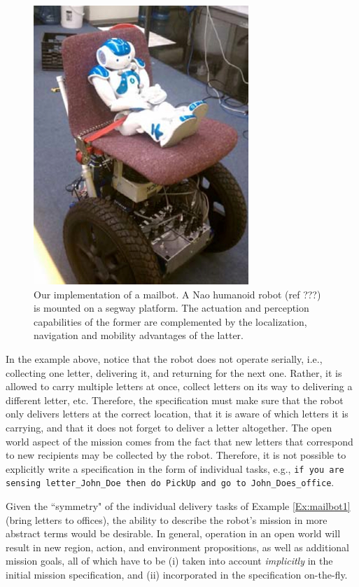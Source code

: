 \begin{figure}[ht]
	\centering
	\includegraphics[width=0.7\columnwidth, clip]{./img/pr3.jpg}
	\caption{Our implementation of a mailbot. A Nao humanoid robot (ref ???) is mounted on a segway platform. The actuation and perception capabilities of the former are complemented by the localization, navigation and mobility advantages of the latter.}
	\label{Fig:pr3}
\end{figure}

In the example above, notice that the robot does not operate serially, i.e., collecting one letter, delivering it, and returning for the next one. Rather, it is allowed to carry multiple letters at once, collect letters on its way to delivering a different letter, etc. Therefore, the specification must make sure that the robot only delivers letters at the correct location, that it is aware of which letters it is carrying, and that it does not forget to deliver a letter altogether. The open world aspect of the mission comes from the fact that new letters that correspond to new recipients may be collected by the robot. Therefore, it is not possible to explicitly write a specification in the form of individual tasks, e.g., \texttt{if you are sensing letter\_John\_Doe then do PickUp and go to John\_Does\_office}.

Given the ``symmetry" of the individual delivery tasks of Example \ref{Ex:mailbot1} (bring letters to offices), the ability to describe the robot's mission in more abstract terms would be desirable. In general, operation in an open world will result in new region, action, and environment propositions, as well as additional mission goals, all of which have to be (i) taken into account \emph{implicitly} in the initial mission specification, and (ii) incorporated in the specification on-the-fly.

